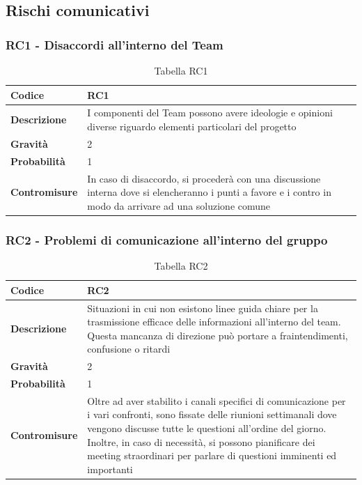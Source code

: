 \documentclass{article}
\begin{document}
    
    \subsection{Rischi comunicativi}
            
    \subsubsection{RC1 - Disaccordi all’interno del Team}
    \begin{table}[h]
        \renewcommand{\arraystretch}{1.5}
        \centering
        \begin{tabular}{|p{3cm}|p{11cm}|}
            \hline
            \textbf{Codice} & RC1 \\
            \hline
            \textbf{Descrizione} & I componenti del Team possono avere ideologie e opinioni diverse riguardo elementi particolari del progetto \\
            \hline
            \textbf{Gravità} & 2 \\
            \hline
            \textbf{Probabilità} & 1 \\
            \hline
            \textbf{Contromisure} & In caso di disaccordo, si procederà con una discussione interna dove si elencheranno i punti a favore e i contro in modo da arrivare ad una soluzione comune \\
            \hline
        \end{tabular}
        \caption{Tabella RC1}
    \end{table}

    \subsubsection{RC2 - Problemi di comunicazione all’interno del gruppo}
    \begin{table}[h]
        \renewcommand{\arraystretch}{1.5}
        \centering
        \begin{tabular}{|p{3cm}|p{11cm}|}
            \hline
            \textbf{Codice} & RC2 \\
            \hline
            \textbf{Descrizione} & Situazioni in cui non esistono linee guida chiare per la trasmissione efficace delle informazioni all’interno del team. Questa mancanza di direzione può portare a fraintendimenti, confusione o ritardi \\
            \hline
            \textbf{Gravità} & 2 \\
            \hline
            \textbf{Probabilità} & 1 \\
            \hline
            \textbf{Contromisure} & Oltre ad aver stabilito i canali specifici di comunicazione per i vari confronti, sono fissate delle riunioni settimanali dove vengono discusse tutte le questioni all’ordine del giorno. Inoltre, in caso di necessità, si possono pianificare dei meeting straordinari per parlare di questioni imminenti ed importanti \\
            \hline
        \end{tabular}
        \caption{Tabella RC2}
    \end{table}
\end{document}

